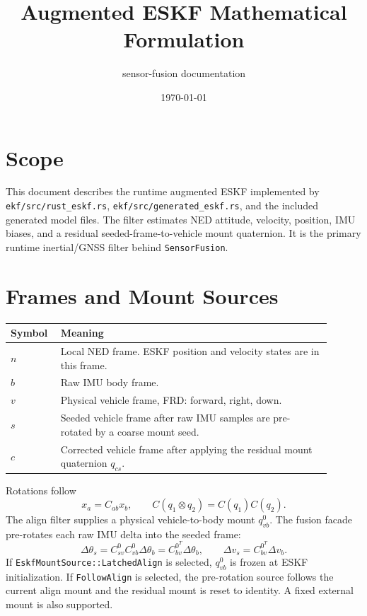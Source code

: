 \documentclass[11pt]{article}
\title{Augmented ESKF Mathematical Formulation}
\author{sensor-fusion documentation}
\date{\today}
\newcommand{\T}{^{T}}
\begin{document}
\maketitle
\tableofcontents
\newpage

\section{Scope}

This document describes the runtime augmented ESKF implemented by
\texttt{ekf/src/rust\_eskf.rs}, \texttt{ekf/src/generated\_eskf.rs}, and the
included generated model files. The filter estimates NED attitude, velocity,
position, IMU biases, and a residual seeded-frame-to-vehicle mount quaternion.
It is the primary runtime inertial/GNSS filter behind \texttt{SensorFusion}.

\section{Frames and Mount Sources}

\begin{longtable}{>{\raggedright\arraybackslash}p{0.12\linewidth} >{\raggedright\arraybackslash}p{0.78\linewidth}}
\toprule
\textbf{Symbol} & \textbf{Meaning} \\
\midrule
\(n\) & Local NED frame. ESKF position and velocity states are in this frame. \\
\(b\) & Raw IMU body frame. \\
\(v\) & Physical vehicle frame, FRD: forward, right, down. \\
\(s\) & Seeded vehicle frame after raw IMU samples are pre-rotated by a coarse mount seed. \\
\(c\) & Corrected vehicle frame after applying the residual mount quaternion \(q_{cs}\). \\
\bottomrule
\end{longtable}

Rotations follow
\begin{equation}
  x_a=C_{ab}x_b,\qquad C(q_1\otimes q_2)=C(q_1)C(q_2).
\end{equation}
The align filter supplies a physical vehicle-to-body mount \(q_{vb}^{0}\). The
fusion facade pre-rotates each raw IMU delta into the seeded frame:
\begin{equation}
  \Delta\theta_s=C_{sv}^{0}C_{vb}^{0}\Delta\theta_b
  =C_{bv}^{0\T}\Delta\theta_b,
  \qquad
  \Delta v_s=C_{bv}^{0\T}\Delta v_b .
\end{equation}
If \texttt{EskfMountSource::LatchedAlign} is selected, \(q_{vb}^{0}\) is frozen
at ESKF initialization. If \texttt{FollowAlign} is selected, the pre-rotation
source follows the current align mount and the residual mount is reset to
identity. A fixed external mount is also supported.
\end{document}
